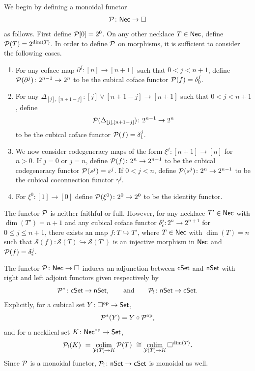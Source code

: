 We begin by defining a monoidal functor
\[
\mathcal{P} \colon \mathsf{Nec} \to \square
\]
as follows.
First define $\mathcal{P}[0] = 2^0$.
On any other necklace $T \in \mathsf{Nec}$, define $\mathcal{P}(T) = 2^{\dim(T)}$.
In order to define $\mathcal{P}$ on morphisms, it is sufficient to consider the following cases.
\begin{enumerate}
	\item For any coface map $\partial^j \colon [n] \to [n+1]$ such that $0< j<{n+1}$, define $\mathcal{P}(\partial^j) \colon 2^{n-1}\to 2^{n}$ to be the cubical coface functor $\mathcal{P}(f)= \delta_0^{j}$.

	\item For any $\Delta_{[j], [n+1-j]} \colon [j] \vee [n+1-j] \to [n+1]$ such that $0<j<n+1$, define
	\[
	\mathcal{P}(\Delta_{[j], [n+1-j]}) \colon 2^{n-1}\to 2^{n}
	\]
	to be the cubical coface functor $\mathcal{P}(f)=\delta_1^{j}$.

	\item We now consider codegeneracy maps of the form $\xi^j \colon [n+1] \to [n]$ for $n>0$.
	If $j=0$ or $j=n$, define $\mathcal{P}(f) \colon 2^n \to 2^{n-1}$ to be the cubical codegeneracy functor $\mathcal{P}(s^j)= \varepsilon^{j}$.
	If $0<j<n$, define $\mathcal{P}(s^j) \colon 2^n \to 2^{n-1}$ to be the cubical coconnection functor $\gamma^{j}$.

	\item For $\xi^0 \colon [1] \to [0]$ define $\mathcal{P}(\xi^0) \colon 2^0 \to 2^0$ to be the identity functor.
\end{enumerate}

\begin{remark*}
	The functor $\mathcal{P}$ is neither faithful or full.
	However, for any necklace $T' \in \mathsf{Nec}$ with $\dim(T')=n+1$ and any cubical coface functor $\delta_{\epsilon}^j \colon 2^n \to 2^{n+1}$ for $0 \leq j \leq n+1$, there exists an map $f \colon T \hookrightarrow T'$, where $T \in \mathsf{Nec}$ with $\dim(T)=n$ such that $\mathcal{S}(f) \colon \mathcal{S}(T) \hookrightarrow \mathcal{S}(T')$ is an injective morphism in $\mathsf{Nec}$ and $\mathcal{P}(f) = \delta_{\epsilon}^j$.
\end{remark*}

The functor $\mathcal{P} \colon \mathsf{Nec} \to \square$ induces an adjunction between $\mathsf{cSet}$ and $\mathsf{nSet}$ with right and left adjoint functors given respectively by
\[
\mathcal{P}^\ast \colon \mathsf{cSet} \to \mathsf{nSet},
\qquad \text{and} \qquad
\mathcal{P}_{!} \colon \mathsf{nSet} \to \mathsf{cSet}.
\]
Explicitly, for a cubical set $Y \colon \square^{\mathrm{op}} \to \mathsf{Set}$,
\[
\mathcal{P}^\ast(Y)= Y \circ \mathcal{P}^{\mathrm{op}},
\]
and for a necklical set $K \colon \mathsf{Nec}^{\mathrm{op}} \to \mathsf{Set}$,
\[
\mathcal{P}_{!}(K) \ =
\operatorname*{colim}_{\mathcal{Y}(T) \to K} \mathcal{P}(T) \ \cong
\operatorname*{colim}_{\mathcal{Y}(T) \to K} \square^{\dim(T)}.
\]
Since $\mathcal{P}$ is a monoidal functor, $\mathcal{P}_{!} \colon \mathsf{nSet} \to \mathsf{cSet}$ is monoidal as well.

